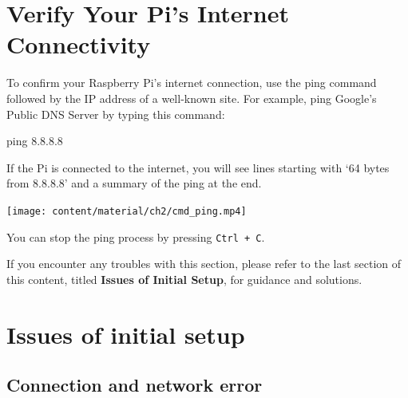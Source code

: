 \documentclass[
  letterpaper,
]{scrbook}
\newenvironment{Shaded}{\begin{snugshade}}{\end{snugshade}}
\newcommand{\FunctionTok}[1]{\textcolor[rgb]{0.28,0.35,0.67}{#1}}
\newcommand{\NormalTok}[1]{\textcolor[rgb]{0.00,0.23,0.31}{#1}}
\begin{document}
\hypertarget{verify-your-pis-internet-connectivity}{%
\section{Verify Your Pi's Internet
Connectivity}\label{verify-your-pis-internet-connectivity}}

To confirm your Raspberry Pi's internet connection, use the ping command
followed by the IP address of a well-known site. For example, ping
Google's Public DNS Server by typing this command:

\begin{Shaded}
\begin{Highlighting}[]
\FunctionTok{ping}\NormalTok{ 8.8.8.8}
\end{Highlighting}
\end{Shaded}

If the Pi is connected to the internet, you will see lines starting with
`64 bytes from 8.8.8.8' and a summary of the ping at the end.

\texttt{[image: content/material/ch2/cmd\_ping.mp4]}

You can stop the ping process by pressing \texttt{Ctrl\ +\ C}.

\begin{tcolorbox}[enhanced jigsaw, left=2mm, coltitle=black, colframe=quarto-callout-note-color-frame, bottomrule=.15mm, colback=white, bottomtitle=1mm, breakable, colbacktitle=quarto-callout-note-color!10!white, titlerule=0mm, toptitle=1mm, arc=.35mm, rightrule=.15mm, opacityback=0, title=\textcolor{quarto-callout-note-color}{\faInfo}\hspace{0.5em}{Note}, toprule=.15mm, leftrule=.75mm, opacitybacktitle=0.6]

If you encounter any troubles with this section, please refer to the
last section of this content, titled \textbf{Issues of Initial Setup},
for guidance and solutions.

\end{tcolorbox}

\hypertarget{issues-of-initial-setup}{%
\section{Issues of initial setup}\label{issues-of-initial-setup}}

\hypertarget{connection-and-network-error}{%
\subsection{Connection and network
error}\label{connection-and-network-error}}
\end{document}
